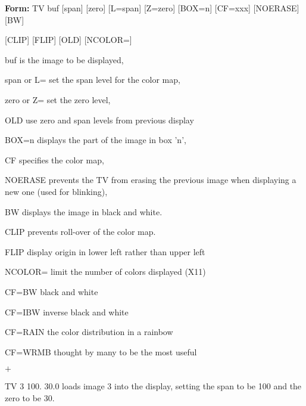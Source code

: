 {\newpage\clearpage
{}%
\begin{command}
  \item[\textbf{Form: }TV buf {[span]} {[zero]} {[L=span]} {[Z=zero]} 
       {[BOX=n]} {[CF=xxx]} {[NOERASE]} {[BW]}\hfill]{}
  \item[{[CLIP]} {[FLIP]} {[OLD]} {[NCOLOR=]}\hfill]{}
  \item[buf]{is the image to be displayed,}
  \item[span or L=]{set the span level for the color map,}
  \item[zero or Z=]{set the zero level,}
  \item[OLD]{use zero and span levels from previous display}
  \item[BOX=n]{displays the part of the image in box 'n',}
  \item[CF]{specifies the color map,}
  \item[NOERASE]{prevents the TV from erasing the previous image
       when displaying a new one (used for blinking),}
  \item[BW]{displays the image in black and white.}
  \item[CLIP]{prevents roll-over of the color map.}
  \item[FLIP]{display origin in lower left rather than upper left}
  \item[NCOLOR=]{limit the number of colors displayed (X11)}
\end{command}%
\lthtmlfigureZ
\lthtmlcheckvsize\clearpage}

{\newpage\clearpage
{}%
\begin{example}
  \item[CF=BW\hfill]{black and white}
  \item[CF=IBW\hfill]{inverse black and white}
  \item[CF=RAIN\hfill]{the color distribution in a rainbow}
  \item[CF=WRMB\hfill]{thought by many to be the most useful}
\end{example}%
\lthtmlfigureZ
\lthtmlcheckvsize\clearpage}

{\newpage\clearpage
{}%
$+$%
\lthtmlinlinemathZ
\lthtmlcheckvsize\clearpage}

{\newpage\clearpage
{}%
\begin{example}
  \item[{TV 3 100. 30.0\hfill}]{loads image 3 into the display, setting the
       span to be 100 and the zero to be 30.}
\end{example}%
\lthtmlfigureZ
\lthtmlcheckvsize\clearpage}

